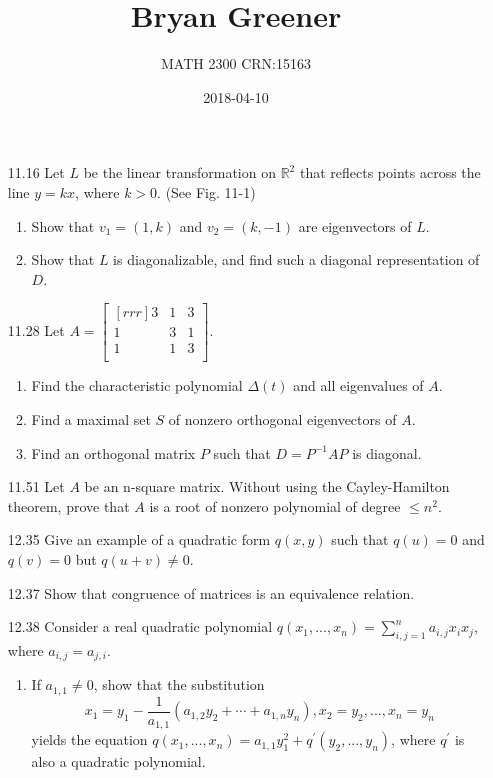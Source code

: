 \documentclass[12pt]{article}
\title{Bryan Greener}
\author{MATH 2300 CRN:15163}
\date{2018-04-10}
\theoremstyle{definition}
\theoremstyle{plain}
\begin{document}
\maketitle

\TabPositions{4cm}
\begin{enumerate}
\item[11.16]Let $L$ be the linear transformation on $\mathbb{R}^2$ that reflects points across the line $y=kx$, where $k>0$. (See Fig. 11-1)
	\begin{enumerate}
	\item Show that $v_1=(1,k)$ and $v_2=(k,-1)$ are eigenvectors of $L$.
	\item Show that $L$ is diagonalizable, and find such a diagonal representation of $D$.
	\end{enumerate}
\item[11.28]Let $A=\begin{bmatrix}[rrr]3&1&3\\1&3&1\\1&1&3\\\end{bmatrix}$.
	\begin{enumerate}
	\item Find the characteristic polynomial $\Delta(t)$ and all eigenvalues of $A$.
	\item Find a maximal set $S$ of nonzero orthogonal eigenvectors of $A$.
	\item Find an orthogonal matrix $P$ such that $D=P^{-1}AP$ is diagonal.
	\end{enumerate}
\item[11.51]Let $A$ be an n-square matrix. Without using the Cayley-Hamilton theorem, prove that $A$ is a root of nonzero polynomial of degree $\leq n^2$.
\item[12.35]Give an example of a quadratic form $q(x,y)$ such that $q(u)=0$ and $q(v)=0$ but $q(u+v)\neq 0$.
\item[12.37]Show that congruence of matrices is an equivalence relation.
\item[12.38]Consider a real quadratic polynomial $q(x_1,...,x_n)=\sum_{i,j=1}^na_{i,j}x_ix_j$, where $a_{i,j}=a_{j,i}$.
	\begin{enumerate}
	\item If $a_{1,1}\neq 0$, show that the substitution
	\[ x_1=y_1-\dfrac{1}{a_{1,1}}(a_{1,2}y_2+\cdots+a_{1,n}y_n), x_2=y_2,...,x_n=y_n \]
	yields the equation $q(x_1,...,x_n)=a_{1,1}y_1^2+q^\prime(y_2,...,y_n)$, where $q^\prime$ is also a quadratic polynomial.

\end{enumerate}
\end{enumerate}
\end{document}
